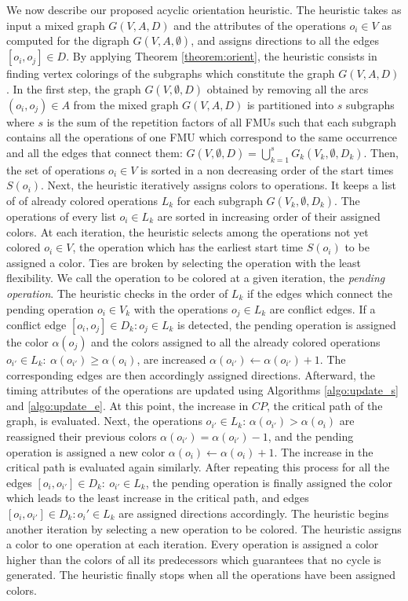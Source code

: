 We now describe our proposed acyclic orientation heuristic. The heuristic takes as input a mixed graph $G(V,A,D)$ and the attributes of the operations $o_i \in V$ as computed for the digraph $G(V,A,\emptyset)$, and assigns directions to all the edges $[o_i,o_j] \in D$. By applying Theorem \ref{theorem:orient}, the heuristic consists in finding vertex colorings of the subgraphs which constitute the graph $G(V,A,D)$. 
In the first step, the graph $G(V,\emptyset,D)$ obtained by removing all the arcs $(o_i,o_j) \in A$ from the mixed graph $G(V,A,D)$ is partitioned into $s$ subgraphs where $s$ is the sum of the repetition factors of all FMUs such that each subgraph contains all the operations of one FMU which correspond to the same occurrence and all the edges that connect them: $ G(V,\emptyset,D)= \bigcup_{k=1}^s G_k(V_k,\emptyset,D_k)$. Then, the set of operations $o_i \in V$ is sorted in a non decreasing order of the start times $S(o_i)$. Next, the heuristic iteratively assigns colors to operations. 
It keeps a list of of already colored operations $L_k$ for each subgraph $G(V_k,\emptyset,D_k)$. The operations of every list $o_i \in L_k$ are sorted in increasing order of their assigned colors. At each iteration, the heuristic selects among the operations not yet colored $o_i \in V$, the operation which has the earliest start time $S(o_i)$ to be assigned a color. Ties are broken by selecting the operation with the least flexibility. We call the operation to be colored at a given iteration, the \textit{pending operation}. The heuristic checks in the order of $L_k$ if the edges which connect the pending operation $o_i \in V_k$ with the operations $o_j \in L_k$ are conflict edges. 
If a conflict edge $[o_i,o_j] \in D_k: o_j \in L_k$ is detected, the pending operation is assigned the color $\alpha(o_j)$ and the colors assigned to all the already colored operations $o_{i'} \in L_k:\ \alpha(o_{i'}) \geq \alpha(o_{i})$, are increased $\alpha(o_{i'}) \leftarrow \alpha(o_{i'})+1$. The corresponding edges are then accordingly assigned directions. Afterward, the timing attributes of the operations are updated using Algorithms \ref{algo:update_s} and \ref{algo:update_e}. At this point, the increase in $CP$, the critical path of the graph, is evaluated. Next, the operations $o_{i'} \in L_k$: $\alpha(o_{i'}) > \alpha(o_{i})$ are reassigned their previous colors $\alpha(o_{i'}) = \alpha(o_{i'})-1$, and the pending operation is assigned a new color $\alpha(o_i) \leftarrow \alpha(o_i)+1$. The increase in the critical path is evaluated again similarly. After repeating this process for all the edges $[o_i,o_{i'}] \in D_k:\ o_{i'} \in L_k$, the pending operation is finally assigned the color which leads to the least increase in the critical path, and edges $[o_i,o_{i'}] \in D_k : o_i' \in L_k$ are assigned directions accordingly. The heuristic begins another iteration by selecting a new operation to be colored. The heuristic assigns a color to one operation at each iteration. Every operation is assigned a color higher than the colors of all its predecessors which guarantees that no cycle is generated. The heuristic finally stops when all the operations have been assigned colors. 

